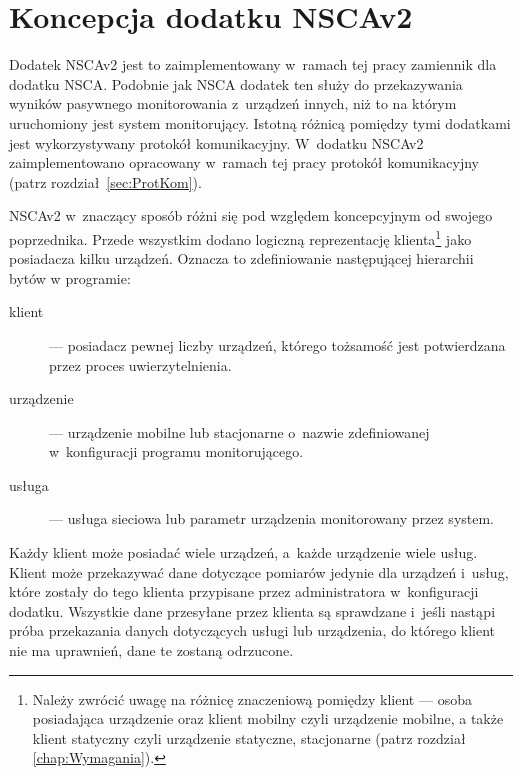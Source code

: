 \section[Koncepcja dodatku NSCAv2][Koncepcja dodatku NSCAv2]{Koncepcja
  dodatku NSCAv2}
\label{sec:ProjModOdb}

Dodatek NSCAv2 jest to zaimplementowany w~ramach tej pracy zamiennik
dla dodatku NSCA. Podobnie jak NSCA dodatek ten służy do przekazywania
wyników pasywnego monitorowania z~urządzeń innych, niż to na którym
uruchomiony jest system monitorujący. Istotną różnicą pomiędzy tymi
dodatkami jest wykorzystywany protokół komunikacyjny. W~dodatku NSCAv2
zaimplementowano opracowany w~ramach tej pracy protokół komunikacyjny
(patrz rozdział~\ref{sec:ProtKom}).

NSCAv2 w~znaczący sposób różni się pod względem koncepcyjnym od
swojego poprzednika. Przede wszystkim dodano logiczną reprezentację
klienta\footnote{Należy zwrócić uwagę na różnicę znaczeniową pomiędzy
  klient --- osoba posiadająca urządzenie oraz klient mobilny
  czyli urządzenie mobilne, a także klient statyczny czyli
  urządzenie statyczne, stacjonarne (patrz rozdział
  \ref{chap:Wymagania}).} jako posiadacza kilku urządzeń. Oznacza to
zdefiniowanie następującej hierarchii bytów w programie:

\begin{description}
\item[klient] --- posiadacz pewnej liczby urządzeń, którego tożsamość
  jest potwierdzana przez proces uwierzytelnienia.
\item[urządzenie] --- urządzenie mobilne lub stacjonarne o~nazwie
  zdefiniowanej w~konfiguracji programu monitorującego.
\item[usługa] --- usługa sieciowa lub parametr urządzenia monitorowany
  przez system.
\end{description}

Każdy klient może posiadać wiele urządzeń, a~każde urządzenie wiele
usług. Klient może przekazywać dane dotyczące pomiarów jedynie dla
urządzeń i~usług, które zostały do tego klienta przypisane przez
administratora w~konfiguracji dodatku. Wszystkie dane przesyłane przez
klienta są sprawdzane i~jeśli nastąpi próba przekazania danych
dotyczących usługi lub urządzenia, do którego klient nie ma uprawnień,
dane te zostaną odrzucone.

